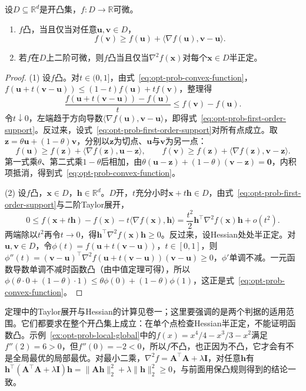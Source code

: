 \begin{theorem}[凸性的一阶与二阶判据]
\label{thm:opt-prob-convex-criteria}
设$D\subseteq\mathbb R^d$是开凸集，$f:D\to\mathbb R$可微。
\begin{enumerate}
  \item $f$凸，当且仅当对任意$\bm u,\bm v\in D$，
  \begin{equation}
    f(\bm v)\geq f(\bm u)+\langle\nabla f(\bm u),\bm v-\bm u\rangle.
    \label{eq:opt-prob-first-order-support}
  \end{equation}
  \item 若$f$在$D$上二阶可微，则$f$凸当且仅当$\nabla^2f(\bm x)$对每个$\bm x\in D$半正定。
\end{enumerate}
\end{theorem}

\begin{proof}
(1) 设$f$凸。对$t\in(0,1]$，由式~\eqref{eq:opt-prob-convex-function}，$f(\bm u+t(\bm v-\bm u))\leq(1-t)f(\bm u)+tf(\bm v)$，整理得
\[
  \frac{f(\bm u+t(\bm v-\bm u))-f(\bm u)}{t}\leq f(\bm v)-f(\bm u).
\]
令$t\downarrow0$，左端趋于方向导数$\langle\nabla f(\bm u),\bm v-\bm u\rangle$，即得式~\eqref{eq:opt-prob-first-order-support}。反过来，设式~\eqref{eq:opt-prob-first-order-support}对所有点成立。取$\bm z=\theta\bm u+(1-\theta)\bm v$，分别以$\bm z$为切点、$\bm u$与$\bm v$为另一点：
\[
  f(\bm u)\geq f(\bm z)+\langle\nabla f(\bm z),\bm u-\bm z\rangle,\qquad
  f(\bm v)\geq f(\bm z)+\langle\nabla f(\bm z),\bm v-\bm z\rangle.
\]
第一式乘$\theta$、第二式乘$1-\theta$后相加，由$\theta(\bm u-\bm z)+(1-\theta)(\bm v-\bm z)=\bm 0$，内积项抵消，得到式~\eqref{eq:opt-prob-convex-function}。

(2) 设$f$凸，$\bm x\in D$，$\bm h\in\mathbb R^d$。$D$开，$t$充分小时$\bm x+t\bm h\in D$，由式~\eqref{eq:opt-prob-first-order-support}与二阶Taylor展开，
\[
  0\leq f(\bm x+t\bm h)-f(\bm x)-t\langle\nabla f(\bm x),\bm h\rangle=\frac{t^2}{2}\bm h^\top\nabla^2f(\bm x)\bm h+o(t^2).
\]
两端除以$t^2$再令$t\to0$，得$\bm h^\top\nabla^2f(\bm x)\bm h\geq0$。反过来，设Hessian处处半正定。对$\bm u,\bm v\in D$，令$\phi(t)=f(\bm u+t(\bm v-\bm u))$，$t\in[0,1]$，则$\phi''(t)=(\bm v-\bm u)^\top\nabla^2f(\bm u+t(\bm v-\bm u))(\bm v-\bm u)\geq0$，$\phi'$单调不减。一元函数导数单调不减时函数凸（由中值定理可得），所以$\phi(\theta\cdot0+(1-\theta)\cdot1)\leq\theta\phi(0)+(1-\theta)\phi(1)$，这正是式~\eqref{eq:opt-prob-convex-function}。
\end{proof}

定理中的Taylor展开与Hessian的计算见卷一；这里要强调的是两个判据的适用范围。它们都要求在整个开凸集上成立：在单个点检查Hessian半正定，不能证明函数凸。示例~\ref{ex:opt-prob-local-global}中的$f(x)=x^4/4-x^3/3-x^2$满足$f''(2)=6>0$，但$f''(0)=-2<0$，所以$f$不凸，也正因为不凸，它才会有不是全局最优的局部最优。对最小二乘，$\nabla^2f=\bm A^\top\bm A+\lambda\bm I$，对任意$\bm h$有$\bm h^\top(\bm A^\top\bm A+\lambda\bm I)\bm h=\lVert\bm A\bm h\rVert_2^2+\lambda\lVert\bm h\rVert_2^2\geq0$，与前面用保凸规则得到的结论一致。

